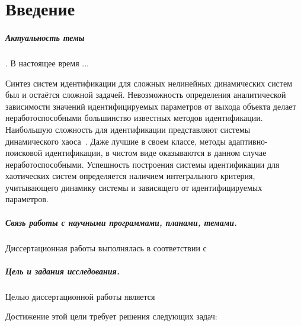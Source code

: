 \chapter*{Введение}

\paragraph{Актуальность темы}.
В настоящее время ...

Синтез систем идентификации для сложных нелинейных динамических систем
был и остаётся сложной задачей. Невозможность определения
аналитической зависимости значений идентифицируемых параметров
от выхода объекта делает неработоспособными большинство известных
методов идентификации. Наибольшую сложность для идентификации
представляют системы динамического хаоса~\cite{moon_chaotic_vibr,anisch_nonlin_eff,sprott_212}.
Даже лучшие в своем классе, методы адаптивно-поисковой идентификации, %
в чистом виде оказываются в данном случае неработоспособными.
Успешность построения системы идентификации для хаотических
систем определяется наличием интегрального критерия,
учитывающего динамику системы и зависящего от идентифицируемых параметров.

\paragraph{Связь работы с научными программами, планами, темами.}
Диссертационная работы выполнялась в соответствии с 

\paragraph{Цель и задания исследования.}
Целью диссертационной работы является

Достижение этой цели требует решения следующих задач:

